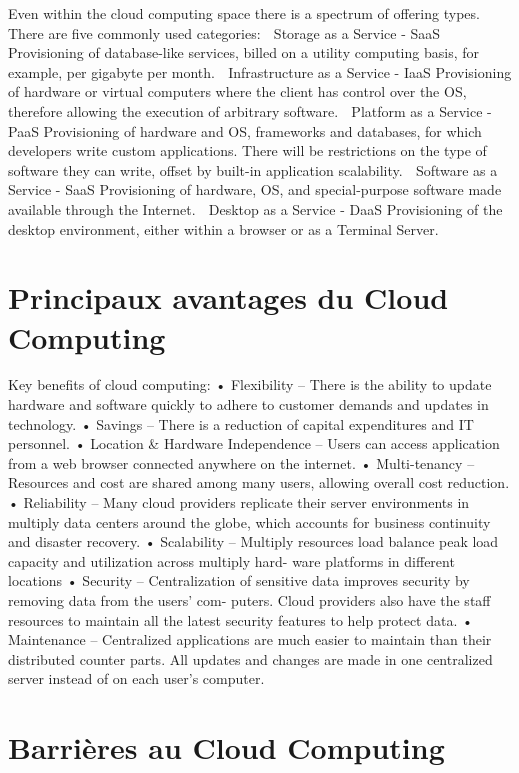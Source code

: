 Even within the cloud computing space there is a spectrum of offering types. There are five commonly used categories:
􏰂 Storage as a Service - SaaS
Provisioning of database-like services, billed on a utility computing basis, for
example, per gigabyte per month.
􏰂 Infrastructure as a Service - IaaS
Provisioning of hardware or virtual computers where the client has control over the OS, therefore allowing the execution of arbitrary software.
􏰂 Platform as a Service - PaaS
Provisioning of hardware and OS, frameworks and databases, for which developers write custom applications. There will be restrictions on the type of software they can write, offset by built-in application scalability.
􏰂 Software as a Service - SaaS
Provisioning of hardware, OS, and special-purpose software made available
through the Internet.
􏰂 Desktop as a Service - DaaS
Provisioning of the desktop environment, either within a browser or as a Terminal Server.

\section{Principaux avantages du Cloud Computing}
Key benefits of cloud computing:
• Flexibility – There is the ability to update hardware and software quickly to adhere to customer demands and updates in technology.
• Savings – There is a reduction of capital expenditures and IT personnel.
• Location & Hardware Independence – Users can access application from a web browser connected anywhere on the internet.
• Multi-tenancy – Resources and cost are shared among many users, allowing overall cost reduction.
• Reliability – Many cloud providers replicate their server environments in multiply data centers around the globe, which accounts for business continuity and disaster recovery.
• Scalability – Multiply resources load balance peak load capacity and utilization across multiply hard- ware platforms in different locations
• Security – Centralization of sensitive data improves security by removing data from the users’ com- puters. Cloud providers also have the staff resources to maintain all the latest security features to help protect data.
• Maintenance – Centralized applications are much easier to maintain than their distributed counter parts. All updates and changes are made in one centralized server instead of on each user’s computer.


\section{Barrières au Cloud Computing}

